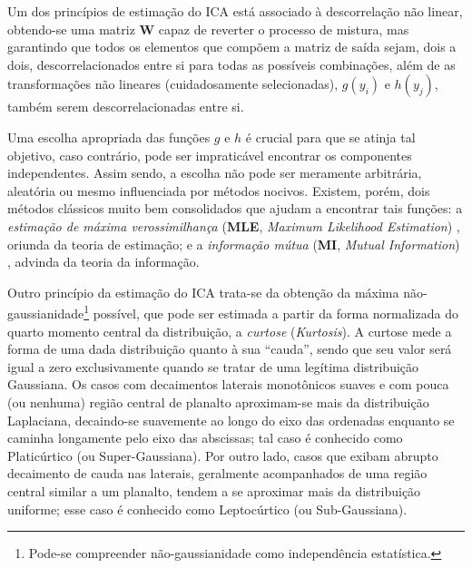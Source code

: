 Um dos princípios de estimação do ICA está associado à descorrelação não linear, obtendo-se uma matriz $\mathbf{W}$ capaz de reverter o processo de mistura, mas garantindo que todos os elementos que compõem a matriz de saída sejam, dois a dois, descorrelacionados entre si para todas as possíveis combinações, além de as transformações não lineares (cuidadosamente selecionadas), $g(y_{i})$ e $h(y_{j})$, também serem descorrelacionadas entre si.

Uma escolha apropriada das funções $g$ e $h$ é crucial para que se atinja tal objetivo, caso contrário, pode ser impraticável encontrar os componentes independentes. Assim sendo, a escolha não pode ser meramente arbitrária, aleatória ou mesmo influenciada por métodos nocivos. Existem, porém, dois métodos clássicos muito bem consolidados que ajudam a encontrar tais funções: a \textit{estimação de máxima verossimilhança} (\textbf{MLE}, \textit{Maximum Likelihood Estimation}) \citep{ra1922mathematical, aldrich1997ra}, oriunda da teoria de estimação; e a \textit{informação mútua} (\textbf{MI}, \textit{Mutual Information}) \citep{cover2012elements}, advinda da teoria da informação.


Outro princípio da estimação do ICA trata-se da obtenção da máxima não-gaussianidade\footnote{Pode-se compreender não-gaussianidade como independência estatística.} possível, que pode ser estimada a partir da forma normalizada do quarto momento central da distribuição, a \textit{curtose} (\textit{Kurtosis}). A curtose mede a forma de uma dada distribuição quanto à sua ``cauda'', sendo que seu valor será igual a zero exclusivamente quando se tratar de uma legítima distribuição Gaussiana. Os casos com decaimentos laterais monotônicos suaves e com pouca (ou nenhuma) região central de planalto aproximam-se mais da distribuição Laplaciana, decaindo-se suavemente ao longo do eixo das ordenadas enquanto se caminha longamente pelo eixo das abscissas; tal caso é conhecido como Platicúrtico (ou Super-Gaussiana). Por outro lado, casos que exibam abrupto decaimento de cauda nas laterais, geralmente acompanhados de uma região central similar a um planalto, tendem a se aproximar mais da distribuição uniforme; esse caso é conhecido como Leptocúrtico (ou Sub-Gaussiana).\\


